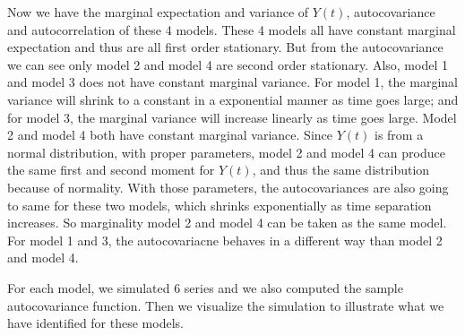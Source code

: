 \documentclass{article}
\begin{document}
\newpage
Now we have the marginal expectation and variance of $Y(t)$, autocovariance and autocorrelation of these 4 models. These 4 models all have constant marginal expectation and thus are all first order stationary. But from the autocovariance we can see only model 2 and model 4 are second order stationary. Also, model 1 and model 3 does not have constant marginal variance. For model 1, the marginal variance will shrink to a constant in a exponential manner as time goes large; and for model 3, the marginal variance will increase linearly as time goes large. Model 2 and model 4 both have constant marginal variance.  Since $Y(t)$ is from a normal distribution, with proper parameters, model 2 and model 4 can produce the same first and second moment for $Y(t)$, and thus the same distribution because of normality. With those parameters, the autocovariances are also going to same for these two models, which shrinks exponentially as time separation increases. So marginality model 2 and model 4 can be taken as the same model. For model 1 and 3, the autocovariacne behaves in a different way than model 2 and model 4. 

For each model, we simulated 6 series and we also computed the sample autocovariance function. Then we visualize the simulation to illustrate what we have identified for these models.
\end{document}
